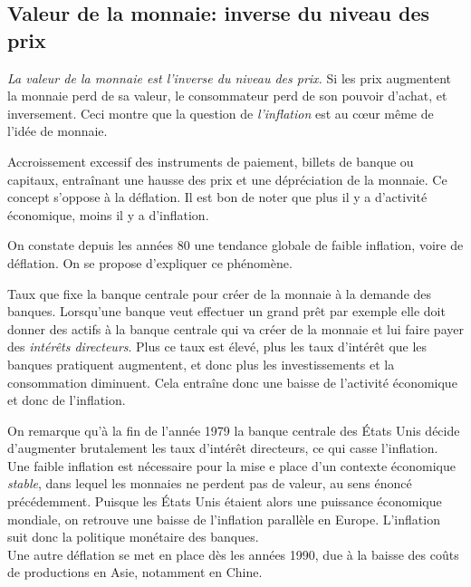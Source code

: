 \documentclass[main.tex]{subfiles}
\begin{document}
        \subsection{Valeur de la monnaie: inverse du niveau des prix}
        \emph{La valeur de la monnaie est l'inverse du niveau des prix.} Si les prix augmentent la monnaie perd de sa valeur, le consommateur perd de son pouvoir d'achat, et inversement. Ceci montre que la question de \emph{l'inflation} est au cœur même de l'idée de monnaie. \\

        \begin{definition}[Inflation]
                Accroissement excessif des instruments de paiement, billets de banque ou capitaux, entraînant une hausse des prix et une dépréciation de la monnaie. Ce concept s'oppose à la déflation.
                Il est bon de noter que plus il y a d'activité économique, moins il y a d'inflation.
        \end{definition}
        On constate depuis les années 80 une tendance globale de faible inflation, voire de déflation. On se propose d'expliquer ce phénomène.

        \begin{definition}
        Taux que fixe la banque centrale pour créer de la monnaie à la demande des banques. Lorsqu'une banque veut effectuer un grand prêt par exemple elle doit donner des actifs à la banque centrale qui va créer de la monnaie et lui faire payer des \emph{intérêts directeurs}. Plus ce taux est élevé, plus les taux d'intérêt que les banques pratiquent augmentent, et donc plus les investissements et la consommation diminuent. Cela entraîne donc une baisse de l'activité économique et donc de l'inflation.
        \end{definition}

        On remarque qu'à la fin de l'année 1979 la banque centrale des États Unis décide d'augmenter brutalement les taux d'intérêt directeurs, ce qui casse l'inflation. Une faible inflation est nécessaire pour la mise e place d'un contexte économique \emph{stable}, dans lequel les monnaies ne perdent pas de valeur, au sens énoncé précédemment. Puisque les États Unis étaient alors une puissance économique mondiale, on retrouve une baisse de l'inflation parallèle en Europe. L'inflation suit donc la politique monétaire des banques. \\

        Une autre déflation se met en place dès les années 1990, due à la baisse des coûts de productions en Asie, notamment en Chine.
\end{document}
